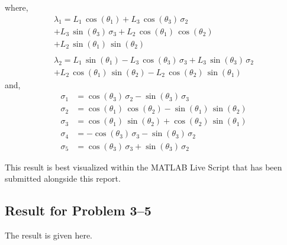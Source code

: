 \documentclass[conference]{IEEEtran}
\begin{document}
where,
\begin{multline*}
    \lambda_1 = L_1 \,\cos \left(\theta_1 \right)+L_3 \,\cos \left(\theta_3 \right)\,\sigma_2 \\+L_3 \,\sin \left(\theta_3 \right)\,\sigma_3 +L_2 \,\cos \left(\theta_1 \right)\,\cos \left(\theta_2 \right)\\+L_2 \,\sin \left(\theta_1 \right)\,\sin \left(\theta_2 \right)\\
    \\
    \lambda_2 = L_1 \,\sin \left(\theta_1 \right)-L_3 \,\cos \left(\theta_3 \right)\,\sigma_3 +L_3 \,\sin \left(\theta_3 \right)\,\sigma_2 \\+L_2 \,\cos \left(\theta_1 \right)\,\sin \left(\theta_2 \right)-L_2 \,\cos \left(\theta_2 \right)\,\sin \left(\theta_1 \right)
\end{multline*}
\hspace{10pt} and,
\begin{align*}
    \sigma_1 &=\cos \left(\theta_3 \right)\,\sigma_2 -\sin \left(\theta_3 \right)\,\sigma_3 \\
    \sigma_2 &=\cos \left(\theta_1 \right)\,\cos \left(\theta_2 \right)-\sin \left(\theta_1 \right)\,\sin \left(\theta_2 \right)\\
    \sigma_3 &=\cos \left(\theta_1 \right)\,\sin \left(\theta_2 \right)+\cos \left(\theta_2 \right)\,\sin \left(\theta_1 \right)\\
    \sigma_4 &= -\cos \left(\theta_3 \right)\,\sigma_3 -\sin \left(\theta_3 \right)\,\sigma_2\\
    \sigma_5 &= \cos \left(\theta_3 \right)\,\sigma_3 +\sin \left(\theta_3 \right)\,\sigma_2
\end{align*}

This result is best visualized within the MATLAB Live Script that has been submitted 
alongside this report.

\subsection{Result for Problem 3--5}

The result is given here.
\end{document}
